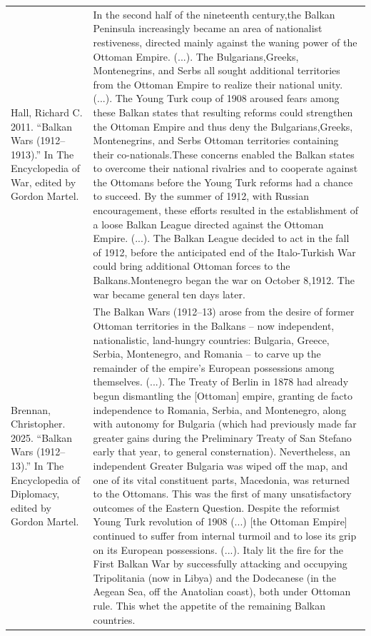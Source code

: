 {\begin{longtable}{p{}p{}}
\\
Hall, Richard C. 2011. “Balkan Wars (1912–1913).” In The Encyclopedia of War, edited by Gordon Martel. & In the second half of the nineteenth century,the Balkan Peninsula increasingly became an area of nationalist restiveness, directed mainly against the waning power of the Ottoman Empire. (...). 
The Bulgarians,Greeks, Montenegrins, and Serbs all sought additional territories from the Ottoman Empire to realize their national unity. (...). 
The Young Turk coup of 1908 aroused fears among these Balkan states that resulting reforms could strengthen the Ottoman Empire and thus deny the Bulgarians,Greeks, Montenegrins, and Serbs Ottoman territories containing their co-nationals.These concerns enabled the Balkan states to overcome their national rivalries and to cooperate against the Ottomans before the Young Turk reforms had a chance to succeed. By the summer of 1912, with Russian encouragement, these efforts resulted in the establishment of a loose Balkan League directed against the Ottoman Empire. (...).
The Balkan League decided to act in the fall of 1912, before the anticipated end of the Italo-Turkish War could bring additional Ottoman forces to the Balkans.Montenegro began the war on October 8,1912. The war became general ten days later.
\\
Brennan, Christopher. 2025. “Balkan Wars (1912–13).” In The Encyclopedia of Diplomacy, edited by Gordon Martel. & The Balkan Wars (1912–13) arose from the desire of former Ottoman territories in the Balkans – now independent, nationalistic, land-hungry countries: Bulgaria, Greece, Serbia, Montenegro, and Romania – to carve up the remainder of the empire's European possessions among themselves. (...).
The Treaty of Berlin in 1878 had already begun dismantling the [Ottoman] empire, granting de facto independence to Romania, Serbia, and Montenegro, along with autonomy for Bulgaria (which had previously made far greater gains during the Preliminary Treaty of San Stefano early that year, to general consternation). Nevertheless, an independent Greater Bulgaria was wiped off the map, and one of its vital constituent parts, Macedonia, was returned to the Ottomans. This was the first of many unsatisfactory outcomes of the Eastern Question. Despite the reformist Young Turk revolution of 1908 (...) [the Ottoman Empire] continued to suffer from internal turmoil and to lose its grip on its European possessions. (...). Italy lit the fire for the First Balkan War by successfully attacking and occupying Tripolitania (now in Libya) and the Dodecanese (in the Aegean Sea, off the Anatolian coast), both under Ottoman rule. This whet the appetite of the remaining Balkan countries.

\end{longtable}}
